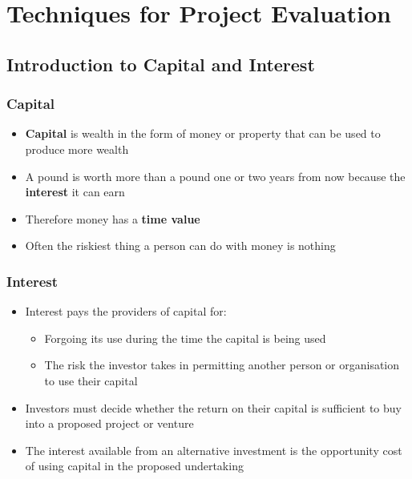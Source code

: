 \documentclass[class=report, crop=false, 12pt,a4paper]{standalone}
\begin{document}
\chapter{Techniques for Project Evaluation}
\section{Introduction to Capital and Interest}
\subsection{Capital}
\begin{itemize}
	\item \textbf{Capital} is wealth in the form of money or property that can be used to produce more wealth
	\item A pound is worth more than a pound one or two years from now because the \textbf{interest} it can earn
	\item Therefore money has a \textbf{time value}
	\item Often the riskiest thing a person can do with money is nothing
\end{itemize}
\subsection{Interest}
\begin{itemize}
	\item Interest pays the providers of capital for:
	\begin{itemize}
		\item Forgoing its use during the time the capital is being used
		\item The risk the investor takes in permitting another person or organisation to use their capital
	\end{itemize}
	\item Investors must decide whether the return on their capital is sufficient to buy into a proposed project or venture
	\item The interest available from an alternative investment is the opportunity cost of using capital in the proposed undertaking
\end{itemize}
\end{document}
